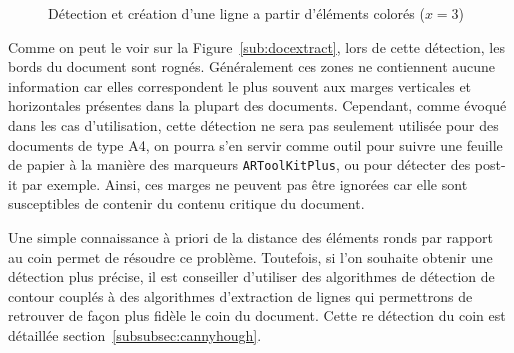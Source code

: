 \begin{figure}[H]
\centering
      \caption{Détection et création d'une ligne a partir d'éléments colorés ($x = 3$)}
      \label{fig:doc:linecluster}
\end{figure}

Comme on peut le voir sur la Figure~\ref{sub:docextract}, lors de cette détection, les bords du document sont rognés. Généralement ces zones ne contiennent aucune information car elles correspondent le plus souvent aux marges verticales et horizontales présentes dans la plupart des documents. Cependant, comme évoqué dans les cas d'utilisation, cette détection ne sera pas seulement utilisée pour des documents de type A4, on pourra s'en servir comme outil pour suivre une feuille de papier à la manière des marqueurs \texttt{ARToolKitPlus}, ou pour détecter des post-it par exemple. Ainsi, ces marges ne peuvent pas être ignorées car elle sont susceptibles de contenir du contenu critique du document.

Une simple connaissance à priori de la distance des éléments ronds par rapport au coin permet de résoudre ce problème. Toutefois, si l'on souhaite obtenir une détection plus précise, il est conseiller d'utiliser des algorithmes de détection de contour couplés à des algorithmes d'extraction de lignes qui permettrons de retrouver de façon plus fidèle le coin du document. Cette re détection du coin est détaillée section~\ref{subsubsec:cannyhough}.

